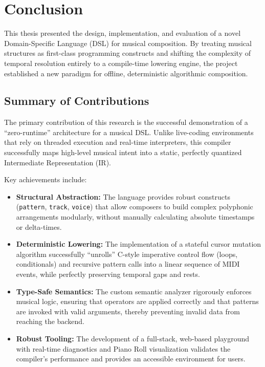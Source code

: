 \chapter{Conclusion}\label{ch:conclusion}

This thesis presented the design, implementation, and evaluation of a novel Domain-Specific Language (DSL) for musical
composition.
By treating musical structures as first-class programming constructs and shifting the complexity of temporal resolution
entirely to a compile-time lowering engine, the project established a new paradigm for offline, deterministic
algorithmic composition.

\section{Summary of Contributions}\label{sec:summary-of-contributions}

The primary contribution of this research is the successful demonstration of a ``zero-runtime'' architecture for a
musical DSL\@.
Unlike live-coding environments that rely on threaded execution and real-time interpreters, this compiler successfully
maps high-level musical intent into a static, perfectly quantized Intermediate Representation (IR).

Key achievements include:
\begin{itemize}
  \item \textbf{Structural Abstraction:} The language provides robust constructs (\texttt{pattern}, \texttt{track},
    \texttt{voice}) that allow composers to build complex polyphonic arrangements modularly, without manually
    calculating absolute timestamps or delta-times.
  \item \textbf{Deterministic Lowering:} The implementation of a stateful cursor mutation algorithm successfully
    ``unrolls'' C-style imperative control flow (loops, conditionals) and recursive pattern calls into a linear sequence
    of MIDI events, while perfectly preserving temporal gaps and rests.
  \item \textbf{Type-Safe Semantics:} The custom semantic analyzer rigorously enforces musical logic, ensuring that
    operators are applied correctly and that patterns are invoked with valid arguments, thereby preventing invalid data
    from reaching the backend.
  \item \textbf{Robust Tooling:} The development of a full-stack, web-based playground with real-time diagnostics and
    Piano Roll visualization validates the compiler's performance and provides an accessible environment for users.
\end{itemize}


